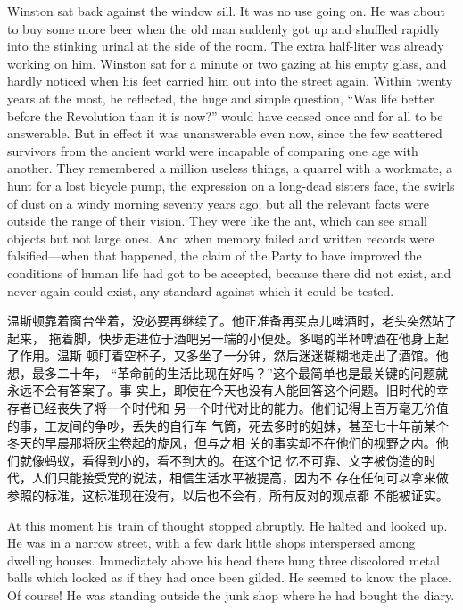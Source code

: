 \begin{paracol}{2}
Winston sat back against the window sill. It was no use going on. He was
about to buy some more beer when the old man suddenly got up and
shuffled rapidly into the stinking urinal at the side of the room. The
extra half-liter was already working on him. Winston sat for a minute or
two gazing at his empty glass, and hardly noticed when his feet carried
him out into the street again. Within twenty years at the most, he
reflected, the huge and simple question, ``Was life better before the
Revolution than it is now?'' would have ceased once and for all to be
answerable. But in effect it was unanswerable even now, since the few
scattered survivors from the ancient world were incapable of comparing
one age with another. They remembered a million useless things, a
quarrel with a workmate, a hunt for a lost bicycle pump, the expression
on a long-dead sister\textquotesingle s face, the swirls of dust on a
windy morning seventy years ago; but all the relevant facts were outside
the range of their vision. They were like the ant, which can see small
objects but not large ones. And when memory failed and written records
were falsified---when that happened, the claim of the Party to have
improved the conditions of human life had got to be accepted, because
there did not exist, and never again could exist, any standard against
which it could be tested.

\switchcolumn

温斯顿靠着窗台坐着，没必要再继续了。他正准备再买点儿啤酒时，老头突然站了起来，
拖着脚，快步走进位于酒吧另一端的小便处。多喝的半杯啤酒在他身上起了作用。温斯
顿盯着空杯子，又多坐了一分钟，然后迷迷糊糊地走出了酒馆。他想，最多二十年，
``革命前的生活比现在好吗？''这个最简单也是最关键的问题就永远不会有答案了。事
实上，即使在今天也没有人能回答这个问题。旧时代的幸存者已经丧失了将一个时代和
另一个时代对比的能力。他们记得上百万毫无价值的事，工友间的争吵，丢失的自行车
气筒，死去多时的姐妹，甚至七十年前某个冬天的早晨那将灰尘卷起的旋风，但与之相
关的事实却不在他们的视野之内。他们就像蚂蚁，看得到小的，看不到大的。在这个记
忆不可靠、文字被伪造的时代，人们只能接受党的说法，相信生活水平被提高，因为不
存在任何可以拿来做参照的标准，这标准现在没有，以后也不会有，所有反对的观点都
不能被证实。

\switchcolumn*

At this moment his train of thought stopped abruptly. He halted and
looked up. He was in a narrow street, with a few dark little shops
interspersed among dwelling houses. Immediately above his head there
hung three discolored metal balls which looked as if they had once been
gilded. He seemed to know the place. Of course! He was standing outside
the junk shop where he had bought the diary.


\end{paracol}
